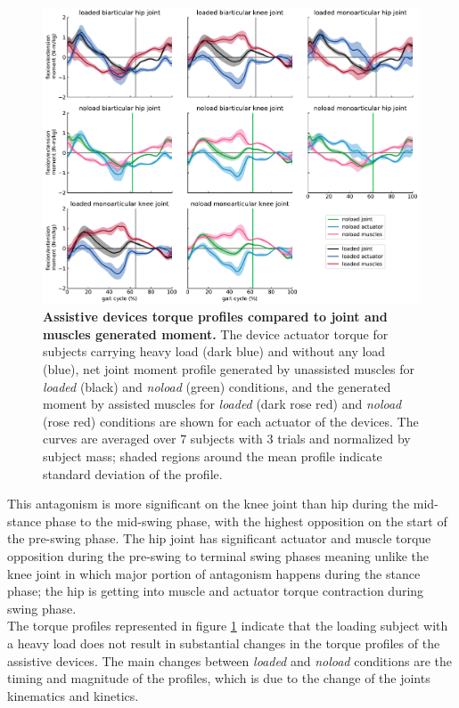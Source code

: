 \documentclass[10pt,letterpaper]{article}
\begin{document}
\begin{figure}[ht]   
	\centering
	\includegraphics[width=\linewidth]{Ideal_Exo_MonovsBi_Figures/PaperFigure_Exoskeletons_Torque.pdf}
	\vspace{1mm}
	\caption{{\small\textbf{Assistive devices torque profiles compared to joint and muscles generated moment.} The device actuator torque for subjects carrying heavy load (dark blue) and without any load (blue), net joint moment profile generated by unassisted muscles for \textit{loaded} (black) and \textit{noload} (green) conditions, and the generated moment by assisted muscles for \textit{loaded} (dark rose red) and \textit{noload} (rose red) conditions are shown for each actuator of the devices. The curves are averaged over 7 subjects with 3 trials and normalized by subject mass; shaded regions around the mean profile indicate standard deviation of the profile.}}
	\label{Fig_IdealExo_Torque}
\end{figure}
This antagonism is more significant on the knee joint than hip during the mid-stance phase to the mid-swing phase, with the highest opposition on the start of the pre-swing phase. The hip joint has significant actuator and muscle torque opposition during the pre-swing to terminal swing phases meaning unlike the knee joint in which major portion of antagonism happens during the stance phase; the hip is getting into muscle and actuator torque contraction during swing phase. \\
The torque profiles represented in figure \ref{Fig_IdealExo_Torque} indicate that the loading subject with a heavy load does not result in substantial changes in the torque profiles of the assistive devices. The main changes between \textit{loaded} and \textit{noload} conditions are the timing and magnitude of the profiles, which is due to the change of the joints kinematics and kinetics.
\end{document}
